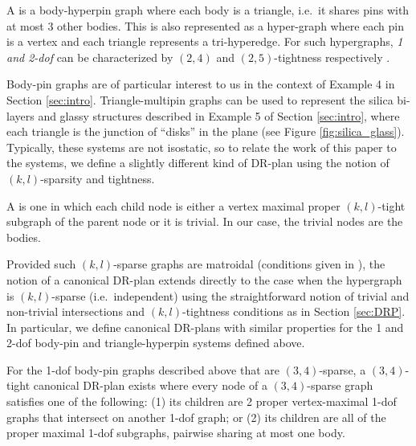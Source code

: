 \begin{definition}
    A  is a body-hyperpin graph where each body is a triangle, i.e.\ it shares  pins with at most 3 other bodies. This is also represented as a hyper-graph where each pin is a vertex and each triangle represents a tri-hyperedge. For such hypergraphs, {\em 1 and 2-dof} can be characterized by $(2,4)$ and $(2,5)$-tightness respectively \cite{Lee:2007:PGA} \cite{streinu2009sparse}.
\end{definition}

Body-pin graphs are of particular interest to us in the context of Example 4 in Section \ref{sec:intro}. Triangle-multipin graphs can be used to represent the silica bi-layers and glassy structures described in Example 5 of Section \ref{sec:intro}, where each triangle is the junction of ``disks'' in the plane (see Figure \ref{fig:silica_glass}). Typically, these systems are not isostatic, so to relate the work of this paper to the systems, we define a slightly different kind of DR-plan using the notion of $(k,l)$-sparsity and tightness.

\begin{definition}
    A  is one in which each child node is either a vertex maximal proper $(k,l)$-tight subgraph of the parent node or it is trivial. In our case, the trivial nodes are the bodies.
\end{definition}

Provided such $(k,l)$-sparse graphs are matroidal (conditions given in \cite{Lee:2007:PGA}),
the notion of a canonical DR-plan extends directly to the case when the hypergraph is $(k,l)$-sparse (i.e.\ independent) using the straightforward notion of trivial and non-trivial intersections and $(k,l)$-tightness conditions as in Section \ref{sec:DRP}. In particular, we define canonical DR-plans with similar properties for the 1 and 2-dof body-pin and triangle-hyperpin systems defined above.

\begin{observation*}
\label{obs:bodypin_drp}
    For the 1-dof body-pin graphs described above that are $(3,4)$-sparse, a $(3,4)$-tight canonical DR-plan exists where every node of a $(3,4)$-sparse graph satisfies one of the following: (1) its children are 2 proper vertex-maximal 1-dof graphs that intersect on another 1-dof graph; or (2) its children are all of the proper maximal 1-dof subgraphs, pairwise sharing at most one body.
\end{observation*}

